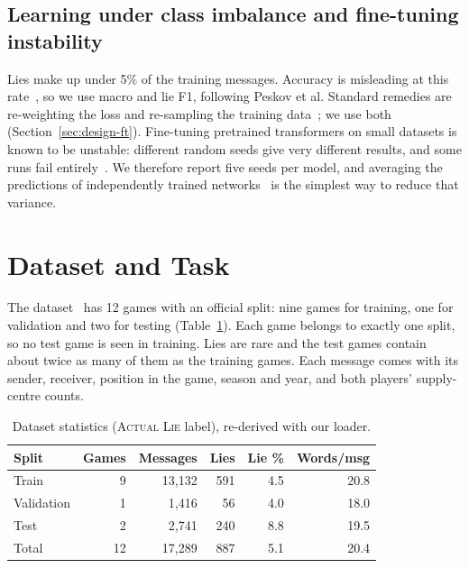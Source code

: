 \documentclass[conference]{IEEEtran}
\begin{document}
\subsection{Learning under class imbalance and fine-tuning instability}
Lies make up under 5\% of the training messages. Accuracy is misleading at this rate~\cite{japkowicz2002class}, so we use macro and lie F1, following Peskov et al. Standard remedies are re-weighting the loss and re-sampling the training data~\cite{he2009imbalanced}; we use both (Section~\ref{sec:design-ft}). Fine-tuning pretrained transformers on small datasets is known to be unstable: different random seeds give very different results, and some runs fail entirely~\cite{dodge2020finetuning,mosbach2021stability}. We therefore report five seeds per model, and averaging the predictions of independently trained networks~\cite{lakshminarayanan2017ensembles} is the simplest way to reduce that variance.

\section{Dataset and Task}
\label{sec:data}

The dataset~\cite{peskov2020takes,peskov2020repo} has 12 games with an official split: nine games for training, one for validation and two for testing (Table~\ref{tab:data}). Each game belongs to exactly one split, so no test game is seen in training. Lies are rare and the test games contain about twice as many of them as the training games. Each message comes with its sender, receiver, position in the game, season and year, and both players' supply-centre counts.

\begin{table}[t]
\centering
\caption{Dataset statistics (\textsc{Actual Lie} label), re-derived with our loader.}
\label{tab:data}
\begin{tabular}{lrrrrr}
\toprule
Split & Games & Messages & Lies & Lie \% & Words/msg \\
\midrule
Train      & 9  & 13{,}132 & 591 & 4.5 & 20.8 \\
Validation & 1  & 1{,}416  & 56  & 4.0 & 18.0 \\
Test       & 2  & 2{,}741  & 240 & 8.8 & 19.5 \\
\midrule
Total      & 12 & 17{,}289 & 887 & 5.1 & 20.4 \\
\bottomrule
\end{tabular}
\end{table}
\end{document}
